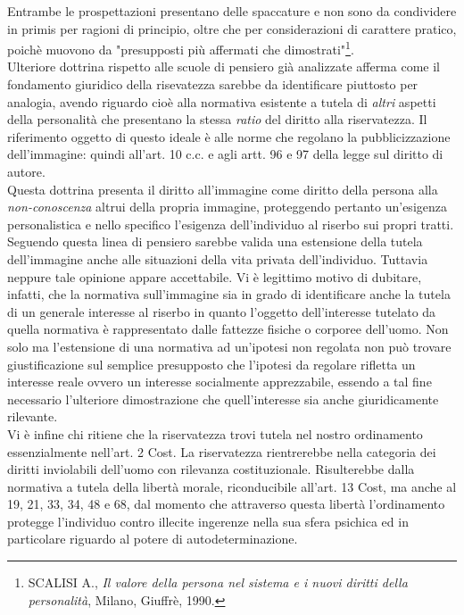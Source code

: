 Entrambe le prospettazioni presentano delle spaccature e non sono da condividere in primis per ragioni di principio, oltre che per considerazioni di carattere pratico, poichè muovono da "presupposti più affermati che dimostrati"\footnote{SCALISI A., \textit{Il valore della persona nel sistema e i nuovi diritti della personalità}, Milano, Giuffrè, 1990.}.
\\Ulteriore dottrina rispetto alle scuole di pensiero già analizzate afferma come il fondamento giuridico della risevatezza sarebbe da identificare piuttosto per analogia, avendo riguardo cioè alla normativa esistente a tutela di \textit{altri} aspetti della personalità che presentano la stessa \textit{ratio} del diritto alla riservatezza.%
Il riferimento oggetto di questo ideale è alle norme che regolano la pubblicizzazione dell'immagine: quindi all'art. 10 c.c. e agli artt. 96 e 97 della legge sul diritto di autore.
\\Questa dottrina presenta il diritto all'immagine come diritto della persona alla \textit{non-conoscenza} altrui della propria immagine, proteggendo pertanto un'esigenza personalistica e nello specifico l'esigenza dell'individuo al riserbo sui propri tratti.
Seguendo questa linea di pensiero sarebbe valida una estensione della tutela dell'immagine anche alle situazioni della vita privata dell'individuo.
Tuttavia neppure tale opinione appare accettabile. 
Vi è legittimo motivo di dubitare, infatti, che la normativa sull'immagine sia in grado di identificare anche la tutela di un generale interesse al riserbo in quanto l'oggetto dell'interesse tutelato da quella normativa è rappresentato dalle fattezze fisiche o corporee dell'uomo.
Non solo ma l'estensione di una normativa ad un'ipotesi non regolata non può trovare giustificazione sul semplice presupposto che l'ipotesi da regolare rifletta un interesse reale ovvero un interesse socialmente apprezzabile, essendo a tal fine necessario l'ulteriore dimostrazione che quell'interesse sia anche giuridicamente rilevante.
\\Vi è infine chi ritiene che la riservatezza trovi tutela nel nostro ordinamento essenzialmente nell'art. 2 Cost. La riservatezza rientrerebbe nella categoria dei diritti inviolabili dell'uomo con rilevanza costituzionale.
Risulterebbe dalla normativa a tutela della libertà morale, riconducibile all'art. 13 Cost, ma anche al 19, 21, 33, 34, 48 e 68, dal momento che attraverso questa libertà l'ordinamento protegge l'individuo contro illecite ingerenze nella sua sfera psichica ed in particolare riguardo al potere di autodeterminazione.
